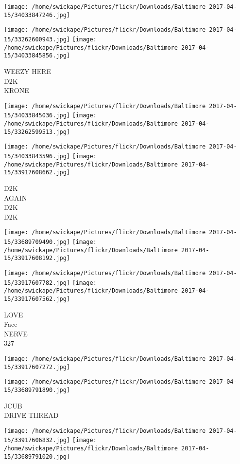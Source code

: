 \documentclass[10pt,letterpaper]{article}
\begin{document}
\texttt{[image: /home/swickape/Pictures/flickr/Downloads/Baltimore 2017-04-15/34033847246.jpg]}

\vspace{0.25in}
\texttt{[image: /home/swickape/Pictures/flickr/Downloads/Baltimore 2017-04-15/33262600943.jpg]}
\texttt{[image: /home/swickape/Pictures/flickr/Downloads/Baltimore 2017-04-15/34033845856.jpg]}

WEEZY HERE\\
D2K\\
KRONE
\pagebreak

\texttt{[image: /home/swickape/Pictures/flickr/Downloads/Baltimore 2017-04-15/34033845036.jpg]}
\texttt{[image: /home/swickape/Pictures/flickr/Downloads/Baltimore 2017-04-15/33262599513.jpg]}

\texttt{[image: /home/swickape/Pictures/flickr/Downloads/Baltimore 2017-04-15/34033843596.jpg]}
\texttt{[image: /home/swickape/Pictures/flickr/Downloads/Baltimore 2017-04-15/33917608662.jpg]}

D2K\\
AGAIN\\
D2K\\
D2K
\pagebreak

\texttt{[image: /home/swickape/Pictures/flickr/Downloads/Baltimore 2017-04-15/33689709490.jpg]}
\texttt{[image: /home/swickape/Pictures/flickr/Downloads/Baltimore 2017-04-15/33917608192.jpg]}

\texttt{[image: /home/swickape/Pictures/flickr/Downloads/Baltimore 2017-04-15/33917607782.jpg]}
\texttt{[image: /home/swickape/Pictures/flickr/Downloads/Baltimore 2017-04-15/33917607562.jpg]}

LOVE\\
Face\\
NERVE\\
327
\pagebreak

\texttt{[image: /home/swickape/Pictures/flickr/Downloads/Baltimore 2017-04-15/33917607272.jpg]}

\vspace{0.25in}
\texttt{[image: /home/swickape/Pictures/flickr/Downloads/Baltimore 2017-04-15/33689791890.jpg]}

JCUB\\
DRIVE THREAD
\pagebreak

\texttt{[image: /home/swickape/Pictures/flickr/Downloads/Baltimore 2017-04-15/33917606832.jpg]}
\texttt{[image: /home/swickape/Pictures/flickr/Downloads/Baltimore 2017-04-15/33689791020.jpg]}
\end{document}
